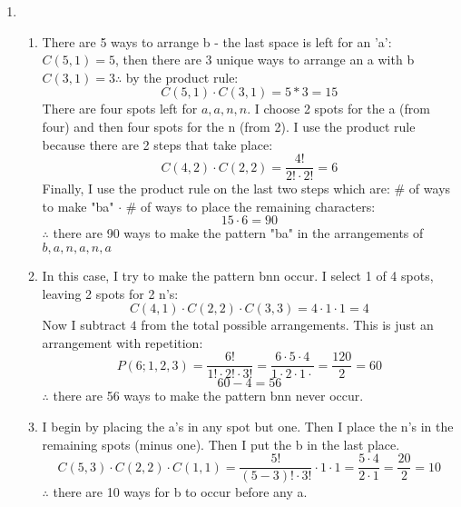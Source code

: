 \documentclass[11pt]{article}
\begin{document}
\begin{enumerate}
				\item {
					      \begin{enumerate}
					      	\item{
					      	      There are 5 ways to arrange b - the last space is left for an 'a': $C(5,1)=5$, then there are 3 unique ways to arrange an a with b $C(3,1) = 3 \therefore$ by the product rule:
					      	      \begin{equation*}
					      	      	C(5, 1) \cdot C(3,1) = 5*3 = 15
					      	      \end{equation*}
					      	      There are four spots left for ${a,a,n,n}$. I choose 2 spots for the a (from four) and then four spots for the n (from 2). I use the product rule because there are 2 steps that take place:
					      	      \begin{equation*}
					      	      	C(4,2) \cdot C(2,2) = \frac{4!}{2!\cdot 2!} = 6
					      	      \end{equation*}
					      	      Finally, I use the product rule on the last two steps which are: \# of ways to make "ba" $\cdot$ \# of ways to place the remaining characters:
					      	      \begin{equation*}
					      	      	15 \cdot 6 = 90
					      	      \end{equation*}
					      	      $\therefore$ there are 90 ways to make the pattern "ba" in the arrangements of ${b,a,n,a,n,a}$
					      	}
					      	\item {
					      		      In this case, I try to make the pattern bnn occur. I select 1 of 4 spots, leaving 2 spots for 2 n's:
					      		      \begin{equation*}
					      		      	C(4,1)\cdot C(2,2)\cdot C(3,3)
					      		      	= 4\cdot 1\cdot 1
					      		      	= 4
					      		      \end{equation*}
					      		      Now I subtract $4$ from the total possible arrangements. This is just an arrangement with repetition:
					      		      \begin{equation*}
					      		      	P(6;1,2,3)=\frac{6!}{1!\cdot 2!\cdot 3!}=\frac{6\cdot 5\cdot 4}{1\cdot 2\cdot 1\cdot}=\frac{120}{2}=60
					      		      \end{equation*}
					      		      \[60 - 4 = 56\]
					      		      $\therefore$ there are 56 ways to make the pattern bnn never occur.
					      		}
					      		\item {
					      			      I begin by placing the a's in any spot but one. Then I place the n's in the remaining spots (minus one). Then I put the b in the last place.
					      			      \begin{equation*}
					      			      	C(5,3)\cdot C(2,2)\cdot C(1,1) = \frac{5!}{(5-3)!\cdot 3!}\cdot 1\cdot 1 = \frac{5\cdot 4}{2\cdot 1} = \frac{20}{2} = 10
					      			      \end{equation*}
					      			}
					      			$\therefore$ there are 10 ways for b to occur before any a. 
					      		\end{enumerate}
					      	}
					      	

\end{enumerate}
\end{document}
